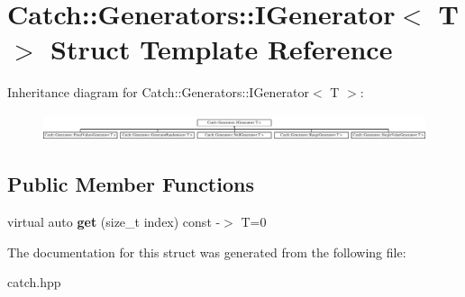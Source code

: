 \hypertarget{struct_catch_1_1_generators_1_1_i_generator}{}\section{Catch\+:\+:Generators\+:\+:I\+Generator$<$ T $>$ Struct Template Reference}
\label{struct_catch_1_1_generators_1_1_i_generator}
Inheritance diagram for Catch\+:\+:Generators\+:\+:I\+Generator$<$ T $>$\+:\begin{figure}[H]
\begin{center}
\leavevmode
\includegraphics[height=0.783217cm]{struct_catch_1_1_generators_1_1_i_generator}
\end{center}
\end{figure}
\subsection*{Public Member Functions}
\begin{DoxyCompactItemize}
\item 
\mbox{\label{struct_catch_1_1_generators_1_1_i_generator_a737a89eb0bff02e580e36c59fb0d1171}} 
virtual auto {\bfseries get} (size\+\_\+t index) const -\/$>$ T=0
\end{DoxyCompactItemize}


The documentation for this struct was generated from the following file\+:\begin{DoxyCompactItemize}
\item 
catch.\+hpp\end{DoxyCompactItemize}
